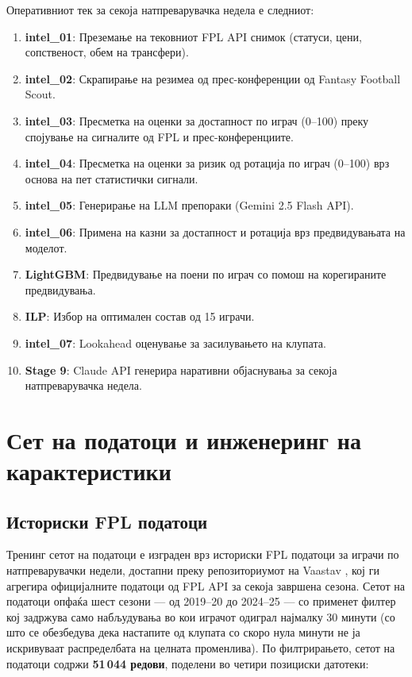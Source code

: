 Оперативниот тек за секоја натпреварувачка недела е следниот:
\begin{enumerate}
  \item \textbf{intel\_01}: Преземање на тековниот FPL API снимок (статуси, цени, сопственост, обем на трансфери).
  \item \textbf{intel\_02}: Скрапирање на резимеа од прес-конференции од Fantasy Football Scout.
  \item \textbf{intel\_03}: Пресметка на оценки за достапност по играч (0--100) преку спојување на сигналите од FPL и прес-конференциите.
  \item \textbf{intel\_04}: Пресметка на оценки за ризик од ротација по играч (0--100) врз основа на пет статистички сигнали.
  \item \textbf{intel\_05}: Генерирање на LLM препораки (Gemini 2.5 Flash API).
  \item \textbf{intel\_06}: Примена на казни за достапност и ротација врз предвидувањата на моделот.
  \item \textbf{LightGBM}: Предвидување на поени по играч со помош на корегираните предвидувања.
  \item \textbf{ILP}: Избор на оптимален состав од 15 играчи.
  \item \textbf{intel\_07}: Lookahead оценување за засилувањето на клупата.
  \item \textbf{Stage 9}: Claude API генерира наративни објаснувања за секоја натпреварувачка недела.
\end{enumerate}

\section{Сет на податоци и инженеринг на карактеристики}

\subsection{Историски FPL податоци}

Тренинг сетот на податоци е изграден врз историски FPL податоци за играчи по натпреварувачки недели, достапни преку репозиториумот на Vaastav \cite{vaastav2024fpl}, кој ги агрегира официјалните податоци од FPL API за секоја завршена сезона. Сетот на податоци опфаќа шест сезони — од 2019--20 до 2024--25 — со применет филтер кој задржува само набљудувања во кои играчот одиграл најмалку 30 минути (со што се обезбедува дека настапите од клупата со скоро нула минути не ја искривуваат распределбата на целната променлива). По филтрирањето, сетот на податоци содржи \textbf{51\,044 редови}, поделени во четири позициски датотеки:

